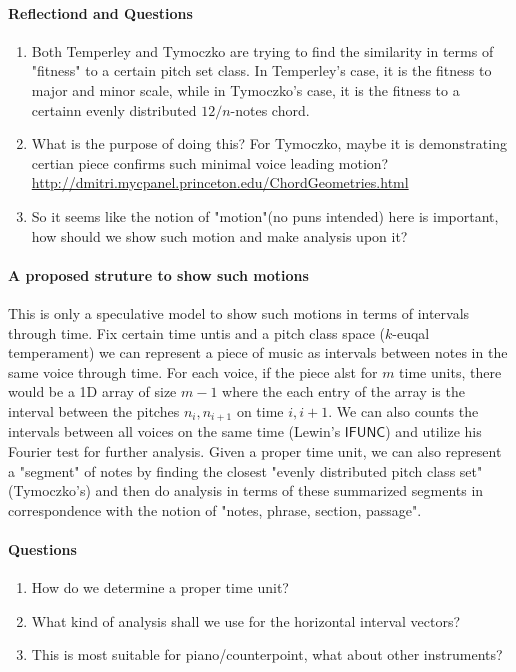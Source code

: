 \paragraph*{Reflectiond and Questions}
\begin{enumerate}
    \item Both Temperley and Tymoczko are trying to find the 
    similarity in terms of "fitness" to a certain pitch set class.
    In Temperley's case, it is the fitness to major and minor scale,
    while in Tymoczko's case, it is the fitness to a certainn evenly distributed
    $12/n$-notes chord. 
    \item What is the purpose of doing this? For Tymoczko, maybe it is
    demonstrating certian piece confirms such minimal voice leading motion?
    \\\url{http://dmitri.mycpanel.princeton.edu/ChordGeometries.html}
    \item So it seems like the notion of "motion"(no puns intended) here is
    important, how should we show such motion and make analysis upon it?
\end{enumerate}
\paragraph*{A proposed struture to show such motions}
This is only a speculative model to show such motions in terms of
intervals through time. Fix certain time untis and a pitch class space
($k$-euqal temperament) we can represent a piece of music as intervals
between notes in the same voice through time. For each voice,
if the piece alst for $m$ time units, there would be a 
1D array of size $m-1$ where the each entry of the array is the
interval between the pitches $n_i, n_{i+1}$ on time $i, i+1$. We 
can also counts the intervals between all voices on the same time
(Lewin's $\mathsf{IFUNC}$) and utilize his Fourier test for further
analysis. Given a proper time unit, we can also represent a "segment"
of notes by finding the closest "evenly distributed pitch class set"(Tymoczko's)
and then do analysis in terms of these summarized segments in correspondence
with the notion of "notes, phrase, section, passage".
\paragraph*{Questions}
\begin{enumerate}
    \item How do we determine a proper time unit?
    \item What kind of analysis shall we use for the horizontal interval vectors?
    \item This is most suitable for piano/counterpoint, what about other instruments?
\end{enumerate}
